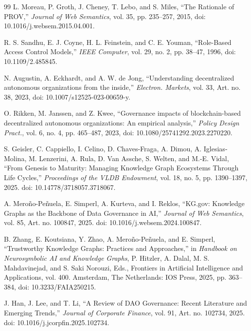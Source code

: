 \documentclass[journal]{IEEEtran}
\begin{document}
\begin{thebibliography}{99}
L. Moreau, P. Groth, J. Cheney, T. Lebo, and S. Miles,
``The Rationale of PROV,''
\emph{Journal of Web Semantics},
vol. 35, pp. 235--257, 2015,
doi: 10.1016/j.websem.2015.04.001.

R. S. Sandhu, E. J. Coyne, H. L. Feinstein, and C. E. Youman,
``Role-Based Access Control Models,''
\emph{IEEE Computer},
vol. 29, no. 2, pp. 38--47, 1996,
doi: 10.1109/2.485845.


N. Augustin, A. Eckhardt, and A. W. de Jong,
``Understanding decentralized autonomous organizations from the inside,''
\emph{Electron. Markets}, vol. 33, Art. no. 38, 2023,
doi: 10.1007/s12525-023-00659-y.

O. Rikken, M. Janssen, and Z. Kwee,
``Governance impacts of blockchain-based decentralized autonomous organizations: An empirical analysis,''
\emph{Policy Design Pract.}, vol. 6, no. 4, pp. 465--487, 2023,
doi: 10.1080/25741292.2023.2270220.

S. Geisler, C. Cappiello, I. Celino, D. Chaves-Fraga, A. Dimou, A. Iglesias-Molina, M. Lenzerini, A. Rula, D. Van Assche, S. Welten, and M.-E. Vidal,
``From Genesis to Maturity: Managing Knowledge Graph Ecosystems Through Life Cycles,''
\emph{Proceedings of the VLDB Endowment}, vol. 18, no. 5, pp. 1390--1397, 2025.
doi: 10.14778/3718057.3718067.

A. Mero{\~n}o-Pe{\~n}uela, E. Simperl, A. Kurteva, and I. Reklos,
``KG.gov: Knowledge Graphs as the Backbone of Data Governance in AI,''
\emph{Journal of Web Semantics}, vol. 85, Art. no. 100847, 2025.
doi: 10.1016/j.websem.2024.100847.

B. Zhang, E. Koutsiana, Y. Zhao, A. Mero{\~n}o-Pe{\~n}uela, and E. Simperl,
``Trustworthy Knowledge Graphs: Practices and Approaches,''
in \emph{Handbook on Neurosymbolic AI and Knowledge Graphs}, P. Hitzler, A. Dalal,
M. S. Mahdavinejad, and S. Saki Norouzi, Eds., Frontiers in Artificial Intelligence
and Applications, vol. 400. Amsterdam, The Netherlands: IOS Press, 2025,
pp. 363--384,
doi: 10.3233/FAIA250215.

J. Han, J. Lee, and T. Li,
``A Review of DAO Governance: Recent Literature and Emerging Trends,''
\emph{Journal of Corporate Finance}, vol. 91, Art. no. 102734, 2025.
doi: 10.1016/j.jcorpfin.2025.102734.


\end{thebibliography}
\end{document}
